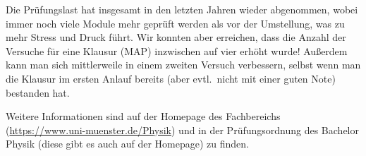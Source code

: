 \begin{multicols}{2}
Die Prüfungslast hat insgesamt in den letzten Jahren wieder abgenommen, wobei immer noch viele Module mehr geprüft werden als vor der Umstellung, was zu mehr Stress und Druck führt.
Wir konnten aber erreichen, dass die Anzahl der Versuche für eine Klausur (MAP) inzwischen auf vier erhöht wurde!
Außerdem kann man sich mittlerweile in einem zweiten Versuch verbessern, selbst wenn man die Klausur im ersten Anlauf bereits (aber evtl.\ nicht mit einer guten Note) bestanden hat.

Weitere Informationen sind auf der Homepage des Fachbereichs (\url{https://www.uni-muenster.de/Physik}) und in der Prüfungsordnung des Bachelor Physik (diese gibt es auch auf der Homepage) zu finden.

\end{multicols}
